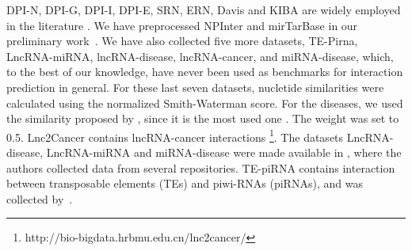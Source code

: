 \documentclass[sn-mathphys-num]{sn-jnl}%
\theoremstyle{thmstyleone}%
\theoremstyle{thmstyletwo}%
\theoremstyle{thmstylethree}%
\begin{document}
DPI-N, DPI-G, DPI-I, DPI-E, SRN, ERN, Davis and KIBA are widely employed in the literature \cite{schrynemackers_classifying_2015,pliakos_network_2019, pliakos_integrating_2019, pliakos_drug-target_2020, ilidio_fast_2024, alves_semi-supervised_2023}. We have preprocessed NPInter and mirTarBase in our preliminary work~\cite{ilidio_fast_2024}. We have also collected five more datasets, TE-Pirna, LncRNA-miRNA, lncRNA-disease, lncRNA-cancer, and miRNA-disease, which, to the best of our knowledge, have never been used as benchmarks for interaction prediction in general.
%
For these last seven datasets, nucletide similarities were calculated using the normalized Smith-Waterman score. For the diseases, we used the similarity proposed by \citet{wang2007new}, since it is the most used one \cite{cheng2019computational}. The weight was set to 0.5.
%
Lnc2Cancer contains lncRNA-cancer interactions \cite{gao2021lnc2cancer}\footnote{http://bio-bigdata.hrbmu.edu.cn/lnc2cancer/}.
%
The datasets LncRNA-disease, LncRNA-miRNA and miRNA-disease were made available in \cite{sheng2023data}, where the authors collected data from several repositories.
%
TE-piRNA contains interaction between transposable elements (TEs) and piwi-RNAs (piRNAs), and was collected by~\cite{dos2024transposable}.
\end{document}
